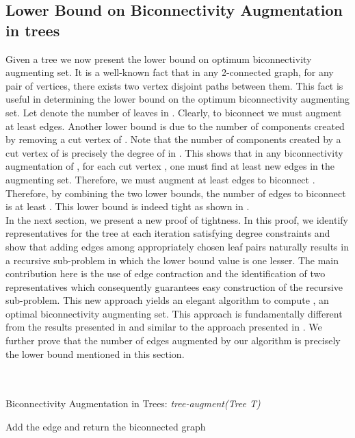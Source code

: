 \documentclass[runningheads]{llncs}
\begin{document}
\subsection{Lower Bound on Biconnectivity Augmentation in trees}
Given a tree  we now present the lower bound on optimum biconnectivity augmenting set.  It is a well-known fact that in any 2-connected graph, for any pair of vertices, there exists two vertex disjoint paths between them.  This fact is useful in determining the lower bound on the optimum biconnectivity augmenting set.  Let  denote the number of leaves in .  Clearly, to biconnect  we must augment at least  edges.  Another lower bound is due to the number of components created by removing a cut vertex of .  Note that the number of components created by a cut vertex  of  is precisely the degree of  in .   This shows that in any biconnectivity augmentation of , for each cut vertex , one must find at least  new edges in the augmenting set.  Therefore, we must augment at least  edges to biconnect .  Therefore, by combining the two lower bounds, the number of edges to biconnect  is at least .  This lower bound is indeed tight as shown in \cite{tarjan}.  \\
In the next section, we present a new proof of tightness.  In this proof, we identify representatives for the tree at each iteration satisfying degree constraints and show that adding edges among appropriately chosen leaf pairs naturally results in a recursive sub-problem in which the lower bound value is one lesser.   The main contribution here is the use of edge contraction and the identification of two representatives which consequently guarantees easy construction of the recursive sub-problem.  This new approach yields an elegant algorithm  to compute , an optimal biconnectivity augmenting set.  This approach is fundamentally different from the results presented in \cite{tarjan,hsu} and similar to the approach presented in \cite{nsn}.   We further prove that the number of edges augmented by our algorithm is precisely the lower bound mentioned in this section.   \\ \\ \\
\begin{algorithm}[h]
\caption{Biconnectivity Augmentation in Trees: {\em tree-augment(Tree T)}} \label{tree-alg1}
\begin{algorithmic}
\STATE Add the edge  and return the biconnected graph
\ELSE{}
\ELSE{}
\ENDIF
\ENDIF
\end{algorithmic}
\end{algorithm}
\end{document}
